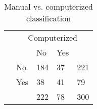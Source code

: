 \begin{table}
\begin{small}
\begin{threeparttable}
\caption{{\normalsize Manual vs. computerized classification}}
\begin{tabular}{ll|ll|l}
& \multicolumn{4}{c}{Computerized} \tabularnewline[0.1cm]
& & No & Yes &   \tabularnewline
\cline{2-5}
\parbox[t]{2mm}{} & No & 184 & 37 & 221 \tabularnewline
& Yes & 38 & 41 & 79 \tabularnewline
{}
&  & 222 & 78 & 300 \tabularnewline
\end{tabular}
\end{threeparttable}
\end{small}
\end{table}

